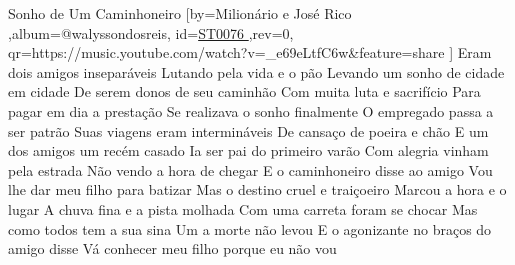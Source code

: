 \beginsong
{Sonho de Um Caminhoneiro %
}[by={Milionário e José Rico %
},album={@walyssondosreis},
id={\href{https://music.youtube.com/watch?v=_e69eLtfC6w&feature=share %
}{ST0076 %
}},rev={0}, %
qr={https://music.youtube.com/watch?v=_e69eLtfC6w&feature=share %
}]
\tom{}{}
\beginverse
Eram dois amigos inseparáveis
Lutando pela vida e o pão
Levando um sonho de cidade em cidade
De serem donos de seu caminhão
Com muita luta e sacrifício
Para pagar em dia a prestação
Se realizava o sonho finalmente
O empregado passa a ser patrão
\endverse
\beginverse
Suas viagens eram intermináveis
De cansaço de poeira e chão
E um dos amigos um recém casado
Ia ser pai do primeiro varão
Com alegria vinham pela estrada
Não vendo a hora de chegar
E o caminhoneiro disse ao amigo
Vou lhe dar meu filho para batizar
\endverse
\beginverse
Mas o destino cruel e traiçoeiro
Marcou a hora e o lugar
A chuva fina e a pista molhada
Com uma carreta foram se chocar
Mas como todos tem a sua sina
Um a morte não levou
E o agonizante no braços do amigo disse
Vá conhecer meu filho porque eu não vou
\endverse


